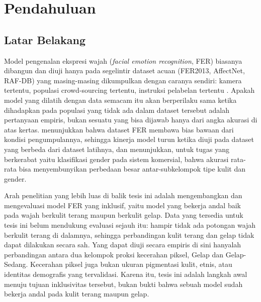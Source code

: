 \chapter{Pendahuluan}
\label{chap:introduction}

\section{Latar Belakang}
\label{sec:background}

Model pengenalan ekspresi wajah (\textit{facial emotion recognition}, FER) biasanya dibangun dan diuji hanya pada segelintir dataset acuan (FER2013, AffectNet, RAF-DB) yang masing-masing dikumpulkan dengan caranya sendiri: kamera tertentu, populasi crowd-sourcing tertentu, instruksi pelabelan tertentu \citep{li2020deep}. Apakah model yang dilatih dengan data semacam itu akan berperilaku sama ketika dihadapkan pada populasi yang tidak ada dalam dataset tersebut adalah pertanyaan empiris, bukan sesuatu yang bisa dijawab hanya dari angka akurasi di atas kertas. \citet{li2020deeper} menunjukkan bahwa dataset FER membawa bias bawaan dari kondisi pengumpulannya, sehingga kinerja model turun ketika diuji pada dataset yang berbeda dari dataset latihnya, dan \citet{buolamwini2018gender} menunjukkan, untuk tugas yang berkerabat yaitu klasifikasi gender pada sistem komersial, bahwa akurasi rata-rata bisa menyembunyikan perbedaan besar antar-subkelompok tipe kulit dan gender.

Arah penelitian yang lebih luas di balik tesis ini adalah mengembangkan dan mengevaluasi model FER yang inklusif, yaitu model yang bekerja andal baik pada wajah berkulit terang maupun berkulit gelap. Data yang tersedia untuk tesis ini belum mendukung evaluasi sejauh itu: hampir tidak ada potongan wajah berkulit terang di dalamnya, sehingga perbandingan kulit terang dan gelap tidak dapat dilakukan secara sah. Yang dapat diuji secara empiris di sini hanyalah perbandingan antara dua kelompok proksi kecerahan piksel, Gelap dan Gelap-Sedang. Kecerahan piksel juga bukan ukuran pigmentasi kulit, etnis, atau identitas demografis yang tervalidasi. Karena itu, tesis ini adalah langkah awal menuju tujuan inklusivitas tersebut, bukan bukti bahwa sebuah model sudah bekerja andal pada kulit terang maupun gelap.

